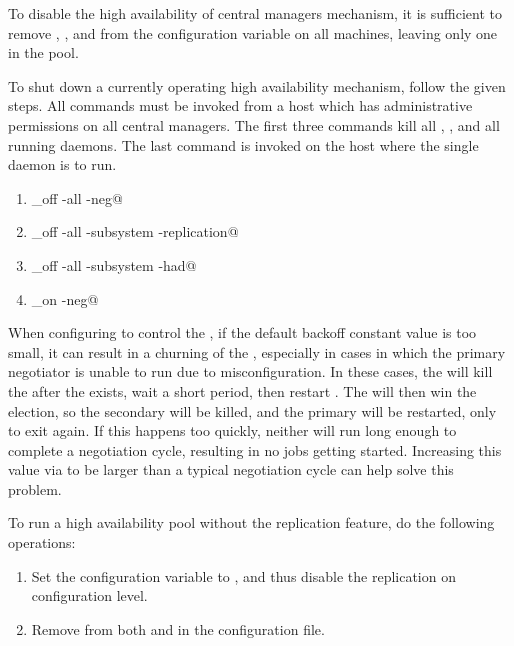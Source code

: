 To disable the high availability of central managers mechanism,
it is sufficient to remove
, ,  and  from the
 configuration variable on all machines,
leaving only one  in the pool. 

To shut down a currently operating high availability mechanism,
follow the given steps.
All commands must be invoked
from a host which has administrative permissions
on all central managers.
The first three commands kill all ,
,
and all running  daemons.
The last command is invoked on the host where the
single  daemon is to run.

\begin{enumerate}
\item \verb@condor_off -all -neg@
\item \verb@condor_off -all -subsystem -replication@
\item \verb@condor_off -all -subsystem -had@
\item \verb@condor_on -neg@
\end{enumerate}

When configuring  to control the ,
if the default backoff constant value is too small, it can result in
a churning of the , especially in cases in which the
primary negotiator is unable to run due to misconfiguration.
In these cases, the  will kill the  after
the  exists, wait a short period, then restart
.  The  will then win the election, so
the secondary  will be killed, and the primary
will be restarted, only to exit again.  If this happens too quickly,
neither  will run long enough to complete a negotiation
cycle, resulting in no jobs getting started.  Increasing this value
via 
to be larger than a typical negotiation cycle can help solve this
problem.

To run a high availability pool without the replication feature,
do the following operations:
\begin{enumerate}
  \item Set the  configuration 
  variable to ,
  and thus disable the replication on configuration level.

  \item Remove  from both  and
   in the configuration file.
\end{enumerate}


